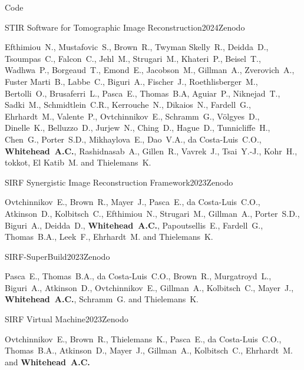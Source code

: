 \documentclass{cv}
\begin{document}
    \begin{rSection}{Code}
        \item \begin{rSubsection}{STIR Software for Tomographic Image Reconstruction}{2024}{Zenodo}{}
            \item Efthimiou~N., Mustafovic~S., Brown~R., Twyman Skelly~R., Deidda~D., Tsoumpas~C., Falcon~C., Jehl~M., Strugari~M., Khateri~P., Beisel~T., Wadhwa~P., Borgeaud~T., Emond~E., Jacobson~M., Gillman~A., Zverovich~A., Fuster Marti~B., Labbe~C., Biguri~A., Fischer~J., Roethlisberger~M., Bertolli~O., Brusaferri~L., Pasca~E., Thomas~B.A, Aguiar~P., Niknejad~T., Sadki~M., Schmidtlein~C.R., Kerrouche~N., Dikaios~N., Fardell~G., Ehrhardt~M., Valente~P., Ovtchinnikov~E., Schramm~G., Völgyes~D., Dinelle~K., Belluzzo~D., Jurjew~N., Ching~D., Hague~D., Tunnicliffe~H., Chen~G., Porter~S.D., Mikhaylova~E., Dao~V.A., da Costa-Luis~C.O., {\bf Whitehead~A.C.}, Rashidnasab~A., Gillen~R., Vavrek~J., Tsai~Y.-J., Kohr~H., tokkot, El Katib~M. and Thielemans~K.
        \end{rSubsection}
        
        \item \begin{rSubsection}{SIRF Synergistic Image Reconstruction Framework}{2023}{Zenodo}{}
            \item Ovtchinnikov~E., Brown~R., Mayer~J., Pasca~E., da Costa-Luis~C.O., Atkinson~D., Kolbitsch~C., Efthimiou~N., Strugari~M., Gillman~A., Porter~S.D., Biguri~A., Deidda~D., {\bf Whitehead~A.C.}, Papoutsellis~E., Fardell~G., Thomas~B.A., Leek~F., Ehrhardt~M. and Thielemans~K.
        \end{rSubsection}

        \item \begin{rSubsection}{SIRF-SuperBuild}{2023}{Zenodo}{}
            \item Pasca~E., Thomas~B.A., da Costa-Luis~C.O., Brown~R., Murgatroyd~L., Biguri~A., Atkinson~D., Ovtchinnikov~E., Gillman~A., Kolbitsch~C., Mayer~J., {\bf Whitehead~A.C.}, Schramm~G. and Thielemans~K.
        \end{rSubsection}
        
        \item \begin{rSubsection}{SIRF Virtual Machine}{2023}{Zenodo}{}
            \item Ovtchinnikov~E., Brown~R., Thielemans~K., Pasca~E., da Costa-Luis~C.O., Thomas~B.A., Atkinson~D., Mayer~J., Gillman~A., Kolbitsch~C., Ehrhardt~M. and {\bf Whitehead~A.C.}
        \end{rSubsection}
    \end{rSection}
\end{document}
